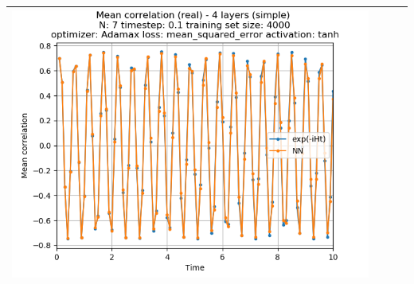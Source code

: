 \documentclass{article}
\begin{document}
\begin{tabular}{|c|c|c|c|}
     \includegraphics[scale=0.37]{./4_layers_simple_train_samples=4000_timestep=0.1_t_total=10.0_optimizer=Adamax_loss=mean_squared_error_activation=tanh/Corr_N=7_(real).png} \\ \hline

\end{tabular}
\end{document}
